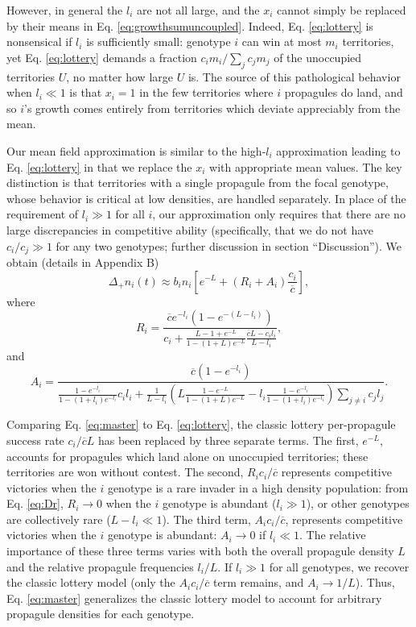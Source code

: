 \documentclass[11pt]{article}
\begin{document}
However, in general the $l_i$ are not all large, and the $x_i$ cannot simply be replaced by their means in Eq. \eqref{eq:growthsumuncoupled}. Indeed, Eq. \eqref{eq:lottery} is nonsensical if $l_i$ is sufficiently small: genotype $i$ can win at most $m_i$ territories, yet Eq. \eqref{eq:lottery} demands a fraction $c_i m_i/\sum_j c_j m_j$ of the unoccupied territories $U$, no matter how large $U$ is. The source of this pathological behavior when $l_i\ll 1$ is that $x_i=1$ in the few territories where $i$ propagules do land, and so $i$'s growth comes entirely from territories which deviate appreciably from the mean.  

Our mean field approximation is similar to the high-$l_i$ approximation leading to Eq. \eqref{eq:lottery} in that we replace the $x_i$ with appropriate mean values. The key distinction is that territories with a single propagule from the focal genotype, whose behavior is critical at low densities, are handled separately. In place of the requirement of $l_i\gg 1$ for all $i$, our approximation only requires that there are no large discrepancies in competitive ability (specifically, that we do not have $c_i/c_j\gg 1$ for any two genotypes; further discussion in section ``Discussion''). We obtain (details in Appendix B)
\begin{equation}
\Delta_+ n_i(t)\approx b_i n_i\left[e^{-L}+(R_i+A_i)\frac{c_i}{\overline{c}}\right], \label{eq:master}
\end{equation}
where
\begin{equation}
R_i=\frac{\overline{c}e^{-l_i}(1-e^{-(L-l_i)})}{c_i +\frac{L-1+e^{-L}}{1-(1+L)e^{-L}}\frac{\overline{c}L- c_il_i}{L-l_i}},\label{eq:Dr}
\end{equation}
and
\begin{equation}
A_i=\frac{\overline{c}(1-e^{-l_i})}{\frac{1-e^{-l_i}}{1-(1+l_i)e^{-l_i}}c_il_i+\frac{1}{L-l_i}\left(L\frac{1-e^{-L}}{1-(1+L)e^{-L}}-l_i\frac{1-e^{-l_i}}{1-(1+l_i)e^{-l_i}}\right)\sum_{j\neq i}c_jl_j}.\label{eq:Da}
\end{equation}

Comparing Eq. \eqref{eq:master} to Eq. \eqref{eq:lottery}, the classic lottery per-propagule success rate $c_i/\overline{c}L$ has been replaced by three separate terms. The first, $e^{-L}$, accounts for propagules which land alone on unoccupied territories; these territories are won without contest. The second, $R_i c_i/\overline{c}$ represents competitive victories when the $i$ genotype is a rare invader in a high density population: from Eq. \eqref{eq:Dr}, $R_i\rightarrow 0$ when the $i$ genotype is abundant ($l_i\gg 1$), or other genotypes are collectively rare ($L-l_i\ll 1$). The third term, $A_ic_i/\overline{c}$, represents competitive victories when the $i$ genotype is abundant: $A_i\rightarrow 0$ if $l_i\ll 1$. The relative importance of these three terms varies with both the overall propagule density $L$ and the relative propagule frequencies $l_i/L$. If $l_i\gg 1$ for all genotypes, we recover the classic lottery model (only the $A_ic_i/\overline{c}$ term remains, and $A_i\rightarrow 1/L$). Thus, Eq. \eqref{eq:master} generalizes the classic lottery model to account for arbitrary propagule densities for each genotype. 
\end{document}
